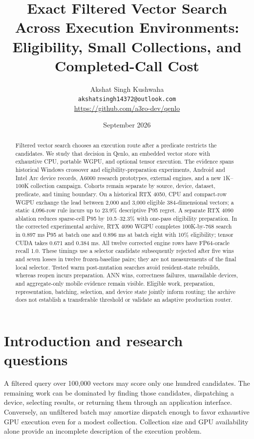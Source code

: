 \documentclass[10pt]{article}
\title{Exact Filtered Vector Search Across Execution Environments:\\Eligibility, Small Collections, and Completed-Call Cost}
\author{Akshat Singh Kushwaha\\\texttt{akshatsingh14372@outlook.com}\\\url{https://github.com/a3ro-dev/qenlo}}
\date{September 2026}
\begin{document}
\maketitle
\begin{abstract}
Filtered vector search chooses an execution route after a predicate restricts the candidates. We study that decision in Qenlo, an embedded vector store with exhaustive CPU, portable WGPU, and optional tensor execution. The evidence spans historical Windows crossover and eligibility-preparation experiments, Android and Intel Arc device records, A6000 research prototypes, external engines, and a new 1K--100K collection campaign. Cohorts remain separate by source, device, dataset, predicate, and timing boundary. On a historical RTX 4050, CPU and compact-row WGPU exchange the lead between 2,000 and 3,000 eligible 384-dimensional vectors; a static 4,096-row rule incurs up to 23.9\% descriptive P95 regret. A separate RTX 4090 ablation reduces sparse-cell P95 by 10.5--32.3\% with one-pass eligibility preparation. In the corrected experimental archive, RTX 4090 WGPU completes 100K-by-768 search in 0.897 ms P95 at batch one and 0.896 ms at batch eight with 10\% eligibility; tensor CUDA takes 0.671 and 0.384 ms. All twelve corrected engine rows have FP64-oracle recall 1.0. These timings use a selector candidate subsequently rejected after five wins and seven losses in twelve frozen-baseline pairs; they are not measurements of the final local selector. Tested warm post-mutation searches avoid resident-state rebuilds, whereas reopen incurs preparation. ANN wins, correctness failures, unavailable devices, and aggregate-only mobile evidence remain visible. Eligible work, preparation, representation, batching, selection, and device state jointly inform routing; the archive does not establish a transferable threshold or validate an adaptive production router.
\end{abstract}

\section{Introduction and research questions}
A filtered query over 100,000 vectors may score only one hundred candidates. The remaining work can be dominated by finding those candidates, dispatching a device, selecting results, or returning them through an application interface. Conversely, an unfiltered batch may amortize dispatch enough to favor exhaustive GPU execution even for a modest collection. Collection size and GPU availability alone provide an incomplete description of the execution problem.
\end{document}
